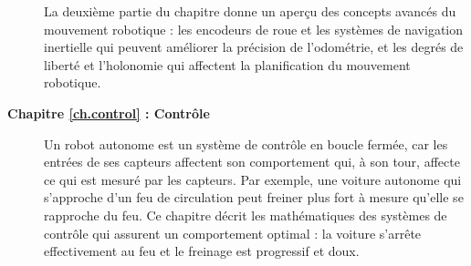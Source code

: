 \begin{description}
La deuxième partie du chapitre donne un aperçu des concepts avancés du mouvement robotique : les encodeurs de roue et les systèmes de navigation inertielle qui peuvent améliorer la précision de l'odométrie, et les degrés de liberté et l'holonomie qui affectent la planification du mouvement robotique.
\smallskip
\item [\textbf{Chapitre \ref{ch.control} : Contrôle}] Un robot autonome est un système de contrôle en boucle fermée, car les entrées de ses capteurs affectent son comportement qui, à son tour, affecte ce qui est mesuré par les capteurs. Par exemple, une voiture autonome qui s'approche d'un feu de circulation peut freiner plus fort à mesure qu'elle se rapproche du feu. Ce chapitre décrit les mathématiques des systèmes de contrôle qui assurent un comportement optimal : la voiture s'arrête effectivement au feu et le freinage est progressif et doux.
\end{description}


